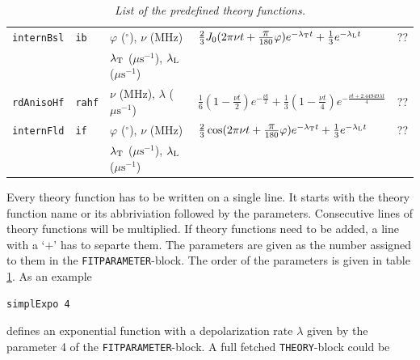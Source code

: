 \documentclass[twoside]{article}
\begin{document}
\begin{table}[h]
\begin{tabular}{|l|l|l|l|l|}
   \rule[-3mm]{0mm}{8mm}
   \texttt{internBsl} & \texttt{ib} & $\varphi$ ($^\circ$), $\nu$ (MHz) 
      & $\frac{2}{3} J_0(2\pi\nu t + \frac{\displaystyle \pi}{180} \varphi) 
         e^{-\lambda_{\rm T} t} + \frac{1}{3} e^{-\lambda_{\rm L} t}$ & ?? \\
      & & $\lambda_{\rm T}$ ($\mu\mathrm{s}^{-1}$), $\lambda_{\rm L}$ ($\mu\mathrm{s}^{-1}$) & & \\  \hline
   \rule[-3mm]{0mm}{8mm}
   \texttt{rdAnisoHf} & \texttt{rahf} & $\nu$ (MHz), $\lambda$ ($\mu\mathrm{s}^{-1}$) 
      & $\frac{1}{6} \left( 1 - \frac{\nu t}{2} \right) e^{-\frac{\nu t}{2}} +
         \frac{1}{3} \left( 1 - \frac{\nu t}{4} \right) e^{-\frac{\nu t + 2.44949 \lambda t}{4}}$ & ?? \\ \hline
   \rule[-3mm]{0mm}{8mm}
   \texttt{internFld} & \texttt{if} & $\varphi$ ($^\circ$), $\nu$ (MHz) 
      & $\frac{2}{3} \cos(2\pi\nu t + \frac{\displaystyle \pi}{180} \varphi) 
         e^{-\lambda_{\rm T} t} + \frac{1}{3} e^{-\lambda_{\rm L} t}$ & ?? \\
      & & $\lambda_{\rm T}$ ($\mu\mathrm{s}^{-1}$), $\lambda_{\rm L}$ ($\mu\mathrm{s}^{-1}$) & & \\ \hline
 \end{tabular}
 \caption{\textsl{List of the predefined theory functions.}}\label{tab:predefined-theory-functions}
\end{table}

Every theory function has to be written on a single line. It starts with the theory function name or its abbriviation followed by the parameters. Consecutive lines of theory functions will be multiplied. If theory functions need to be added, a line with a `$+$' has to separte them. The parameters are given as the number assigned to them in the \texttt{FITPARAMETER}-block. The order of the parameters is given in table \ref{tab:predefined-theory-functions}. As an example

\begin{verbatim}
simplExpo 4
\end{verbatim}

\noindent defines an exponential function with a depolarization rate $\lambda$ given by the parameter 4 of the \texttt{FITPARAMETER}-block. A full fetched \texttt{THEORY}-block could be
\end{document}
